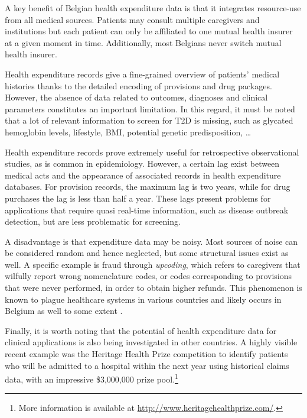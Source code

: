 A key benefit of Belgian health expenditure data is that it integrates resource-use from all medical sources. Patients may consult multiple caregivers and institutions but each patient can only be affiliated to one mutual health insurer at a given moment in time. Additionally, most Belgians never switch mutual health insurer.

Health expenditure records give a fine-grained overview of patients' medical histories thanks to the detailed encoding of provisions and drug packages. However, the absence of data related to outcomes, diagnoses and clinical parameters constitutes an important limitation. In this regard, it must be noted that a lot of relevant information to screen for T2D is missing, such as glycated hemoglobin levels, lifestyle, BMI, potential genetic predisposition, \ldots

Health expenditure records prove extremely useful for retrospective observational studies, as is common in epidemiology. However, a certain lag exist between medical acts  and the appearance of associated records in health expenditure databases. For provision records, the maximum lag is two years, while for drug purchases the lag is less than half a year. These lags present problems for applications that require quasi real-time information, such as disease outbreak detection, but are less problematic for screening.

A disadvantage is that expenditure data may be noisy. Most sources of noise can be considered random and hence neglected, but some structural issues exist as well. A specific example is fraud through \emph{upcoding}, which refers to caregivers that wilfully report wrong nomenclature codes, or codes corresponding to provisions that were never performed, in order to obtain higher refunds. This phenomenon is known to plague healthcare systems in various countries and likely occurs in Belgium as well to some extent \citep{silverman2004medicare,steinbusch2007risk,berta2010effects}.

Finally, it is worth noting that the potential of health expenditure data for clinical applications is also being investigated in other countries. A highly visible recent example was the Heritage Health Prize competition to identify patients who will be admitted to a hospital within the next year using historical claims data, with an impressive \$3,000,000 prize pool.\footnote{More information is available at \url{http://www.heritagehealthprize.com/}.}
